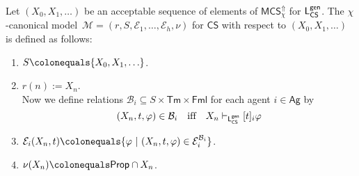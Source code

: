 \documentclass[envcountsect,envcountsame,oribibl,orivec]{llncs}
\newcommand{\Prop}{\textsf{Prop}}
\newcommand{\Formulae}{\textsf{Fml}}
\newcommand{\Terms}{\textsf{Tm}}
\newcommand{\Ag}{\textsf{Ag}}
\newcommand{\jbox}[1]{\left[#1\right]\!}
\newcommand{\tgeneralize}{\Uparrow}
\newcommand{\CS}{\textsf{CS}}
\newcommand{\numberofagents}{h}
\newcommand{\agent}{i}
\newcommand{\evidence}{\mathcal{E}}
\newcommand{\valuation}{\nu}
\newcommand{\M}{\mathcal{M}}
\renewcommand{\phi}{\varphi}
\newcommand{\MCS}{\mathsf{MCS}}
\newcommand{\B}{\mathcal{B}}
\begin{document}
\begin{definition}\label{def:canonical M-model for generalize}
	Let $(X_0, X_1, \ldots)$ be an acceptable sequence of elements of $\MCS_\chi^\tgeneralize$ for ${\sf L}^{\sf gen}_\CS$. The $\chi$-canonical  model~$\M = (r,S,\evidence_1,\ldots,\evidence_\numberofagents, \valuation)$ for $\CS$
	with respect to $(X_0, X_1, \ldots)$
	is  defined as follows:
	\begin{enumerate}
		
		\item $S \colonequals \{X_0, X_1, \ldots\}$.
		\item $r(n) := X_n$.\\
		Now we define relations $\B_\agent \subseteq  S \times \Terms \times \Formulae$ for each agent $\agent \in \Ag$ by
		\[
		(X_n,t,\phi) \in \B_\agent
		\quad\text{if{f}}\quad
		X_n \vdash_{{\sf L}_\CS^{\sf gen}} \jbox{t}_\agent \phi
		\] 
		
		\item $\evidence_\agent(X_n,t) \colonequals \{ \phi\ |\ (X_n, t, \phi) \in \evidence_\agent^{\mathcal{B}_\agent} \}$.
		\item $\valuation(X_n) \colonequals \Prop\cap X_n$.
		
	\end{enumerate}
	
\end{definition}
\end{document}
